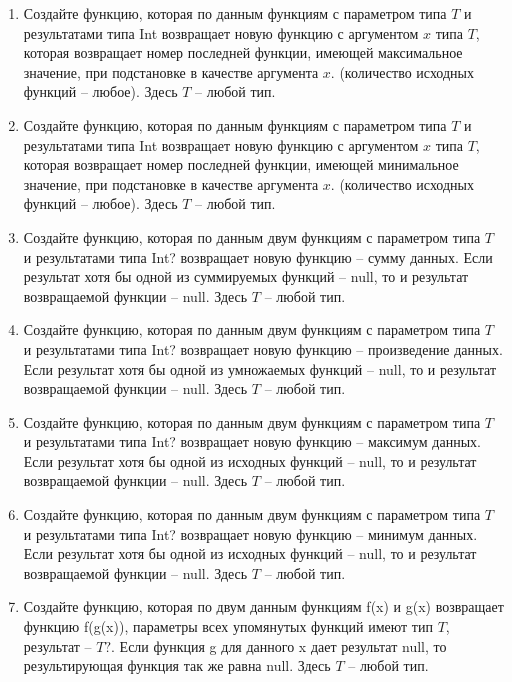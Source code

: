 \begin{enumerate}
	\item Создайте функцию, которая по данным функциям с параметром типа $T$ и результатами типа Int возвращает новую функцию с аргументом $x$ типа $T$,
		которая возвращает номер последней функции, имеющей максимальное значение, при подстановке в качестве аргумента $x$.
		(количество исходных функций -- любое). Здесь $T$ -- любой тип.





	\item Создайте функцию, которая по данным функциям с параметром типа $T$ и результатами типа Int возвращает новую функцию с аргументом $x$ типа $T$,
		которая возвращает номер последней функции, имеющей минимальное значение, при подстановке в качестве аргумента $x$.
		(количество исходных функций -- любое). Здесь $T$ -- любой тип.

	\item Создайте функцию, которая по данным двум функциям с параметром типа $T$ и результатами типа Int? возвращает новую функцию -- сумму данных.
		Если результат хотя бы одной из суммируемых функций -- null, то и результат возвращаемой функции -- null. Здесь $T$ -- любой тип.






	\item Создайте функцию, которая по данным двум функциям с параметром типа $T$ и результатами типа Int? возвращает новую функцию -- произведение данных.
	Если результат хотя бы одной из умножаемых функций -- null, то и результат возвращаемой функции -- null. Здесь $T$ -- любой тип.
	\item Создайте функцию, которая по данным двум функциям с параметром типа $T$ и результатами типа Int? возвращает новую функцию -- максимум данных.
	Если результат хотя бы одной из исходных функций -- null, то и результат возвращаемой функции -- null. Здесь $T$ -- любой тип.
	\item Создайте функцию, которая по данным двум функциям с параметром типа $T$ и результатами типа Int? возвращает новую функцию -- минимум данных.
	Если результат хотя бы одной из исходных функций -- null, то и результат возвращаемой функции -- null. Здесь $T$ -- любой тип.

	\item Создайте функцию, которая по двум данным функциям f(x) и g(x) возвращает функцию f(g(x)), параметры всех упомянутых функций
			имеют тип $T$, результат -- $T?$. Если функция g для данного x дает результат null, то результирующая функция так же
			равна null. Здесь $T$ -- любой тип.


\end{enumerate}
